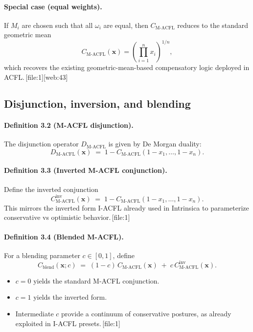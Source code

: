 \documentclass[11pt]{article}
\begin{document}
\paragraph{Special case (equal weights).}
If $M_i$ are chosen such that all $\omega_i$ are equal, then $C_{\text{M-ACFL}}$ reduces to the standard geometric mean
\[
C_{\text{M-ACFL}}(\mathbf{x}) = \left(\prod_{i=1}^n x_i\right)^{1/n},
\]
which recovers the existing geometric-mean-based compensatory logic deployed in ACFL.\,[file:1][web:43] 

\subsection{Disjunction, inversion, and blending}

\paragraph{Definition 3.2 (M-ACFL disjunction).}
The disjunction operator $D_{\text{M-ACFL}}$ is given by De Morgan duality:
\begin{equation}
D_{\text{M-ACFL}}(\mathbf{x}) \;=\; 1 - C_{\text{M-ACFL}}(1 - x_1,\dots,1 - x_n).
\label{eq:m-acfl-disj}
\end{equation}

\paragraph{Definition 3.3 (Inverted M-ACFL conjunction).}
Define the inverted conjunction
\begin{equation}
C_{\text{M-ACFL}}^{\text{inv}}(\mathbf{x}) \;=\; 1 - C_{\text{M-ACFL}}(1 - x_1,\dots,1 - x_n).
\label{eq:m-acfl-inv}
\end{equation}
This mirrors the inverted form I-ACFL already used in Intrinsica to parameterize conservative vs optimistic behavior.\,[file:1] 

\paragraph{Definition 3.4 (Blended M-ACFL).}
For a blending parameter $c \in [0,1]$, define
\begin{equation}
C_{\text{blend}}(\mathbf{x}; c) 
\;=\;
(1 - c)\,C_{\text{M-ACFL}}(\mathbf{x}) \;+\; c\,C_{\text{M-ACFL}}^{\text{inv}}(\mathbf{x}).
\label{eq:m-acfl-blend}
\end{equation}
\begin{itemize}
  \item $c = 0$ yields the standard M-ACFL conjunction.
  \item $c = 1$ yields the inverted form.
  \item Intermediate $c$ provide a continuum of conservative postures, as already exploited in I-ACFL presets.\,[file:1]
\end{itemize}
\end{document}
